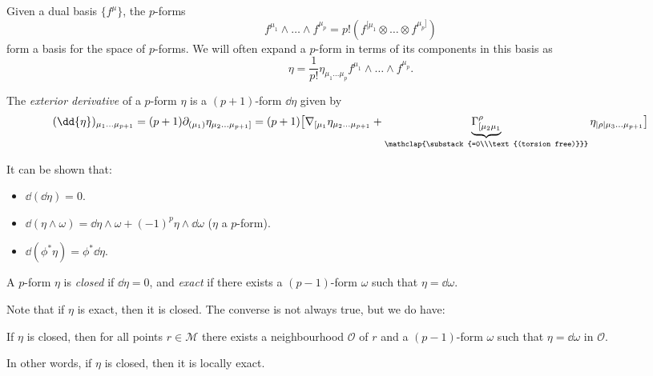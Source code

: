 \documentclass{jknotes}
\begin{document}
Given a dual basis \(\{f^\mu\}\), the \(p\)-forms
\begin{equation}
    f^{\mu_1}\wedge\dots\wedge f^{\mu_p} = p!(f^{[\mu_1}\otimes\dots\otimes f^{\mu_p]})
\end{equation}
form a basis for the space of \(p\)-forms. We will often expand a \(p\)-form in terms of its components in this basis as
\begin{equation}
    \eta = \frac1{p!}\eta_{\mu_1\dots\mu_p} f^{\mu_1}\wedge\dots\wedge f^{\mu_p}.
\end{equation}
\begin{defn}
    The \emph{exterior derivative} of a \(p\)-form \(\eta\) is a \((p+1)\)-form \(\dd{\eta}\) given by
    \begin{equation}
        (\dd{\eta})_{\mu_1\dots\mu_{p+1}} = (p+1)\partial_{(\mu_1)}\eta_{\mu_2\dots\mu_{p+1}]} = (p+1)\big[\nabla_{[\mu_1}\eta_{\mu_2\dots\mu_{p+1}} + \underbrace{\Gamma^\rho_{[\mu_2\mu_1}}_{\mathclap{\substack{=0\\\text{(torsion free)}}}}\eta_{|\rho|\mu_3\dots\mu_{p+1}}\big]
    \end{equation}
\end{defn}
It can be shown that:
\begin{itemize}
    \item \(\dd{(\dd{\eta})} = 0\).
    \item \(\dd{(\eta\wedge\omega)} = \dd{\eta}\wedge\omega + (-1)^p\eta\wedge\dd{\omega}\) (\(\eta\) a \(p\)-form).
    \item \(\dd{(\phi^*\eta)} = \phi^*\dd{\eta}\).
\end{itemize}
\begin{defn}
    A \(p\)-form \(\eta\) is \emph{closed} if \(\dd{\eta}=0\), and \emph{exact} if there exists a \((p-1)\)-form \(\omega\) such that \(\eta = \dd{\omega}\).
\end{defn}
Note that if \(\eta\) is exact, then it is closed. The converse is not always true, but we do have:
\begin{lemma}
    If \(\eta\) is closed, then for all points \(r \in \mathcal{M}\) there exists a neighbourhood \(\mathcal{O}\) of \(r\) and a \((p-1)\)-form \(\omega\) such that \(\eta = \dd{\omega}\) in \(\mathcal{O}\).
\end{lemma}
In other words, if \(\eta\) is closed, then it is locally exact.
\end{document}
